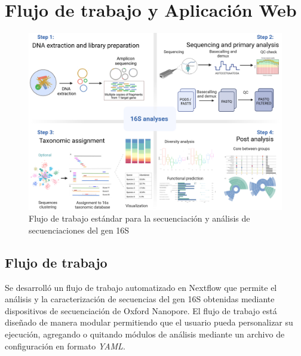 \chapter{Flujo de trabajo y Aplicación Web}

\begin{figure}[H]
    \centering
    \includegraphics[width=1\linewidth]{images/16s_workflow_schema.jpeg}
    \caption{Flujo de trabajo estándar para la secuenciación y análisis de secuenciaciones del gen 16S}
    \label{fig:16S_workflow}
\end{figure}
\section{Flujo de trabajo}
Se desarrolló un flujo de trabajo automatizado en Nextflow que permite el análisis y la caracterización de secuencias del gen 16S obtenidas mediante dispositivos de secuenciación de Oxford Nanopore. 
El flujo de trabajo está diseñado de manera modular permitiendo que el usuario pueda personalizar su ejecución, agregando o quitando módulos de análisis mediante un archivo de configuración en formato \textit{YAML}.  

